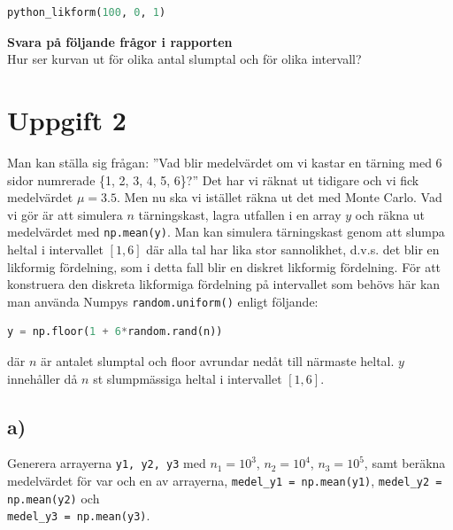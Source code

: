 \documentclass[a4paper]{article}
\begin{document}
\begin{lstlisting}[language=Python]
    python_likform(100, 0, 1)
\end{lstlisting}

\textbf{Svara på följande frågor i rapporten}\\
Hur ser kurvan ut för olika antal slumptal och för olika intervall?


\newpage
\section{Uppgift 2}
Man kan ställa sig frågan: ”Vad blir medelvärdet om vi kastar en tärning med 6 sidor numrerade \{1, 2, 3, 4, 5, 6\}?”
Det har vi räknat ut tidigare och vi fick medelvärdet \( \mu=3.5 \).
Men nu ska vi istället räkna ut det med Monte Carlo.
Vad vi gör är att simulera \( n \)  tärningskast, lagra utfallen i en array \( y \)
och räkna ut medelvärdet med \lstinline{np.mean(y)}. Man kan simulera tärningskast genom att
slumpa heltal i intervallet \( [1,6] \) där alla tal har lika stor sannolikhet,
d.v.s. det blir en likformig fördelning, som i detta fall blir en diskret likformig fördelning.
För att konstruera den diskreta likformiga fördelning på intervallet som behövs här kan man använda
Numpys \lstinline{random.uniform()} enligt följande:

\begin{lstlisting}[language=Python]
    y = np.floor(1 + 6*random.rand(n))
\end{lstlisting}

där \( n \)  är antalet slumptal och floor avrundar nedåt till närmaste heltal. \( y  \)
innehåller då \( n \)  st slumpmässiga heltal i intervallet $[1,6]$.


\subsection{a)}
Generera arrayerna \lstinline{y1, y2, y3} med \( n_1=10^3 \), \( n_2=10^4 \), \( n_3=10^5 \),
samt beräkna medelvärdet för var och en av arrayerna, \lstinline{medel_y1 = np.mean(y1)},
\lstinline{medel_y2 = np.mean(y2)} och \\ \lstinline{medel_y3 = np.mean(y3)}.
\end{document}
